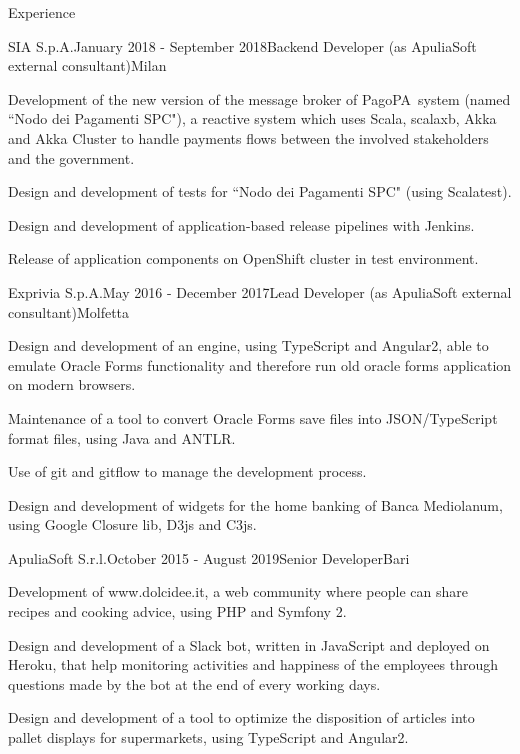 \documentclass{resume} %
\begin{document}
\begin{rSection}{Experience}

\begin{rSubsection}{SIA S.p.A.}{January 2018 - September 2018}{Backend Developer (as ApuliaSoft external consultant)}{Milan}
\item Development of the new version of the message broker of PagoPA\textregistered~system (named ``Nodo dei Pagamenti SPC"),
a reactive system which uses Scala, scalaxb, Akka and Akka Cluster to handle payments flows between the involved stakeholders and the government.
\item Design and development of tests for ``Nodo dei Pagamenti SPC" (using Scalatest).
\item Design and development of application-based release pipelines with Jenkins.
\item Release of application components on OpenShift cluster in test environment.
\end{rSubsection}


\begin{rSubsection}{Exprivia S.p.A.}{May 2016 - December 2017}{Lead Developer (as ApuliaSoft external consultant)}{Molfetta}
\item Design and development of an engine, using TypeScript and Angular2,
able to emulate Oracle Forms functionality and therefore run old oracle forms application on modern browsers.
\item Maintenance of a tool to convert Oracle Forms save files into JSON/TypeScript format files, using Java and ANTLR.
\item Use of git and gitflow to manage the development process.
\item Design and development of widgets for the home banking of Banca Mediolanum, using Google Closure lib, D3js and C3js.
\end{rSubsection}


\begin{rSubsection}{ApuliaSoft S.r.l.}{October 2015 - August 2019}{Senior Developer}{Bari}
\item Development of www.dolcidee.it, a web community where people can share recipes and cooking advice, using PHP and Symfony 2.
\item Design and development of a Slack bot, written in JavaScript and deployed on Heroku, that help monitoring activities and
happiness of the employees through questions made by the bot at the end of every working days.
\item Design and development of a tool to optimize the disposition of articles into pallet displays for supermarkets, using TypeScript and Angular2.
\end{rSubsection}


\end{rSection}
\end{document}
